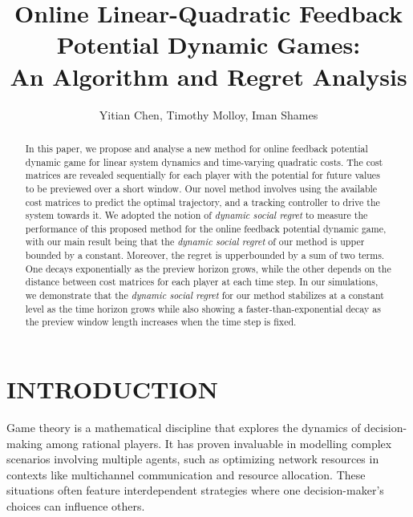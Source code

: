 \documentclass[letterpaper, 10 pt, conference]{ieeeconf}  %
\title{\LARGE \bf
Online Linear-Quadratic Feedback Potential Dynamic Games:\\ An Algorithm and Regret Analysis
}
\author{Yitian Chen, Timothy Molloy, Iman Shames%
}
\begin{document}
\maketitle
\thispagestyle{empty}
\pagestyle{empty}

\begin{abstract}
In this paper, we propose and analyse a new method for online feedback potential dynamic game for linear system dynamics and time-varying quadratic costs. The cost matrices are revealed sequentially for each player with the potential for future values to be previewed over a short window. Our novel method involves using the available cost matrices to predict the optimal trajectory, and a tracking controller to drive the system towards it. We adopted the notion of \emph{dynamic social regret} to measure the performance of this proposed method for the online feedback potential dynamic game, with our main result being that the \emph{dynamic social regret} of our method is upper bounded by a constant. Moreover, the regret is upperbounded by a sum of two terms. One decays exponentially as the preview horizon grows, while the other depends on the distance between cost matrices for each player at each time step. In our simulations, we demonstrate that the \emph{dynamic social regret} for our method stabilizes at a constant level as the time horizon grows while also showing a faster-than-exponential decay as the preview window length increases when the time step is fixed.
\end{abstract}


\section{INTRODUCTION}

Game theory is a mathematical discipline that explores the dynamics of decision-making among rational players. It has proven invaluable in modelling complex scenarios involving multiple agents, such as optimizing network resources in contexts like multichannel communication and resource allocation. These situations often feature interdependent strategies where one decision-maker's choices can influence others.
\end{document}
